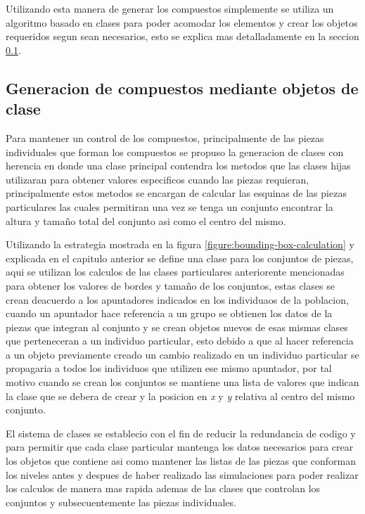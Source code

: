 Utilizando esta manera de generar los compuestos simplemente se utiliza un
algoritmo basado en clases para poder acomodar los elementos y crear los objetos
requeridos segun sean necesarios, esto se explica mas detalladamente en la
seccion \ref{subsection:classorientedidea}.

\subsection{Generacion de compuestos mediante objetos de clase}
\label{subsection:classorientedidea}

Para mantener un control de los compuestos, principalmente de las piezas
individuales que forman los compuestos se propuso la generacion de clases con
herencia en donde una clase principal contendra los metodos que las clases hijas
utilizaran para obtener valores especificos cuando las piezas requieran,
principalmente estos metodos se encargan de calcular las esquinas de las piezas
particulares las cuales permitiran una vez se tenga un conjunto encontrar la
altura y tamaño total del conjunto asi como el centro del mismo.

Utilizando la estrategia mostrada en la figura
\ref{figure:bounding-box-calculation} y explicada en el capitulo anterior se
define una clase para los conjuntos de piezas, aqui se utilizan los calculos de
las clases particulares anteriorente mencionadas para obtener los valores de
bordes y tamaño de los conjuntos, estas clases se crean deacuerdo a los
apuntadores indicados en los individuaos de la poblacion, cuando un apuntador
hace referencia a un grupo se obtienen los datos de la piezas que integran al
conjunto y se crean objetos nuevos de esas mismas clases que perteneceran a un
individuo particular, esto debido a que al hacer referencia a un objeto
previamente creado un cambio realizado en un individuo particular se propagaria
a todos los individuos que utilizen ese mismo apuntador, por tal motivo cuando
se crean los conjuntos se mantiene una lista de valores que indican la clase que
se debera de crear y la posicion en \textit{x} y \textit{y} relativa al centro
del mismo conjunto.

El sistema de clases se establecio con el fin de reducir la redundancia de
codigo y para permitir que cada clase particular mantenga los datos necesarios
para crear los objetos que contiene asi como mantener las listas de las piezas
que conforman los niveles antes y despues de haber realizado las simulaciones
para poder realizar los calculos de manera mas rapida ademas de las clases que
controlan los conjuntos y subsecuentemente las piezas individuales. 

